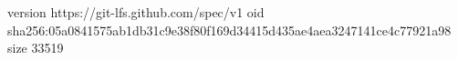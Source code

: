 version https://git-lfs.github.com/spec/v1
oid sha256:05a0841575ab1db31c9e38f80f169d34415d435ae4aea3247141ce4c77921a98
size 33519
